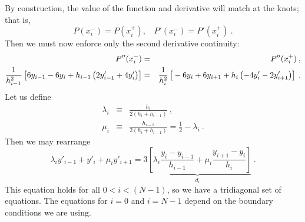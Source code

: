 By construction, the value of the function and derivative will match
at the knots; that is,
\begin{equation}
P(x_i^-) = P(x_i^+), \ \ \ \ P'(x_i^-) = P'(x_i^+)\:. 
\end{equation}
Then we must now enforce only the second derivative continuity:
\begin{eqnarray}
P''(x_i^-) & = & P''(x_i^+)\:,  \\
\frac{1}{h_{i-1}^2}\left[\rule{0pt}{0.3cm}6 y_{i-1} -6 y_i + h_{i-1}\left(2 y'_{i-1} +4 y'_i\right) \right]& = &
\frac{1}{h_i^2}\left[\rule{0pt}{0.3cm}-6 y_i + 6 y_{i+1} +h_i\left( -4 y'_i -2 y'_{i+1} \right)\right] \nonumber\:. 
\end{eqnarray}
Let us define
\begin{eqnarray}
\lambda_i & \equiv & \frac{h_i}{2(h_i+h_{i-1})}\:,  \\
\mu_i & \equiv & \frac{h_{i-1}}{2(h_i+h_{i-1})}  = \frac{1}{2} - \lambda_i\:. 
\end{eqnarray}
Then we may rearrange
\begin{equation}
\lambda_i y'_{i-1} + y'_i + \mu_i y'_{i+1} = \underbrace{3 \left[\lambda_i \frac{y_i - y_{i-1}}{h_{i-1}} + \mu_i \frac{y_{i+1}
    - y_i}{h_i} \right] }_{d_i}\:. 
\end{equation}
This equation holds for all $0<i<(N-1)$, so we have a tridiagonal set of
equations.  The equations for $i=0$ and $i=N-1$ depend on the boundary
conditions we are using.  
